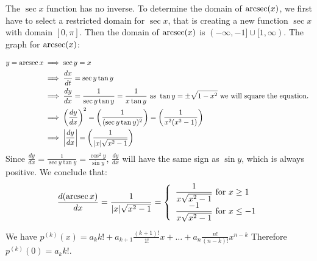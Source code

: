 \begin{numedquestion}
  The $\sec x$ function has no inverse. To determine the domain of $\operatorname{arcsec} (x)$, we first have to select a restricted domain for $\sec x$, that is creating a new function $\sec x$ with domain  $[0, \pi]$. Then the domain of $\operatorname{arcsec}(x)$ is $(-\infty, -1] \cup [1, \infty)$. 
  The graph for $\operatorname{arcsec}(x)$:\\

    \begin{align*}
      y = \operatorname{arcsec} x &\implies  \sec y = x \\
      & \implies \dfrac{d x}{d t} = \sec y \tan y \\
      & \implies \dfrac{d y}{d x} = \dfrac{1}{\sec y \tan y} = \dfrac{1}{x \tan y}\text{ as } \tan y = \pm \sqrt{1 - x^2} \text{ we will square the equation. }\\
      & \implies \left(\dfrac{d y}{d x} \right)^2 = \left(\dfrac{1}{(\sec y \tan y)^2}\right) = \left(\dfrac{1}{x^2 (x^2 - 1)}\right)\\
      & \implies \left|\dfrac{d y}{d x} \right| = \left(\dfrac{1}{|x| \sqrt{x^2 - 1}}\right)\\
    \end{align*}
    Since $\frac{d y}{d x} = \frac{1}{\sec y \tan y} = \frac{\cos^2 y}{\sin y}$, $\frac{d y}{d x}$ will have the same sign as $\sin y$, which is always positive. We conclude that:
\[\dfrac{d(\operatorname{arcsec} x)}{d x} = \dfrac{1}{|x| \sqrt{x^2 - 1}} = \left\{\begin{array}{l}
  \dfrac{1}{x \sqrt{x^2 - 1}}  \text { for } x \geq 1 \\
  \dfrac{-1}{x \sqrt{x^2 - 1}} \text { for } x \leq -1 \end{array}\right.\]
\end{numedquestion}

\begin{numedquestion}
  We have $p^{(k)}(x) = a_k k! + a_{k+1} \frac{(k+1)!}{1!} x + \dots + a_n \frac{n!}{(n-k)!}x^{n-k}$ \newline
  Therefore $p^{(k)}(0) = a_k k!$.
\end{numedquestion}


